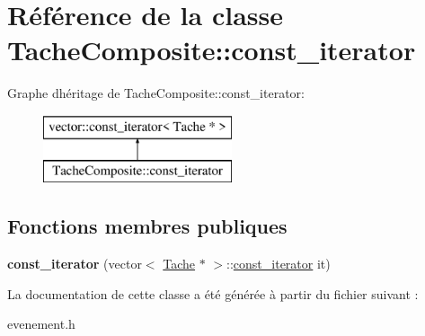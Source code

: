 \hypertarget{class_tache_composite_1_1const__iterator}{}\section{Référence de la classe Tache\+Composite\+:\+:const\+\_\+iterator}
\label{class_tache_composite_1_1const__iterator}
Graphe d\textquotesingle{}héritage de Tache\+Composite\+:\+:const\+\_\+iterator\+:\begin{figure}[H]
\begin{center}
\leavevmode
\includegraphics[height=2.000000cm]{class_tache_composite_1_1const__iterator}
\end{center}
\end{figure}
\subsection*{Fonctions membres publiques}
\begin{DoxyCompactItemize}
\item 
\hypertarget{class_tache_composite_1_1const__iterator_a674fb157f64fa34cc4194e3e59afdfcc}{}{\bfseries const\+\_\+iterator} (vector$<$ \hyperlink{class_tache}{Tache} $\ast$ $>$\+::\hyperlink{class_tache_composite_1_1const__iterator}{const\+\_\+iterator} it)\label{class_tache_composite_1_1const__iterator_a674fb157f64fa34cc4194e3e59afdfcc}

\end{DoxyCompactItemize}


La documentation de cette classe a été générée à partir du fichier suivant \+:\begin{DoxyCompactItemize}
\item 
evenement.\+h\end{DoxyCompactItemize}
